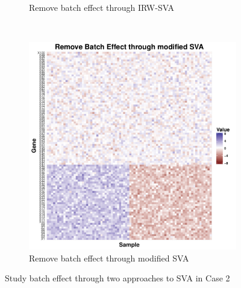 \documentclass[11pt]{article}
\begin{document}
\begin{figure}[h!]
\begin{subfigure}[b]{0.31\textwidth}
        \caption{Remove batch effect through IRW-SVA}
        \label{fig:sva2}
    \end{subfigure}  %
~
    \begin{subfigure}[b]{0.31\textwidth}
        \centering
        \includegraphics[width = \textwidth]{figures/new_sva2.pdf}
        \caption{Remove batch effect through modified SVA}
        \label{fig:new_sva2}
    \end{subfigure}    
    \caption{Study batch effect through two approaches to SVA in Case 2}
    \label{fig:svas2}
\end{figure}
\end{document}
